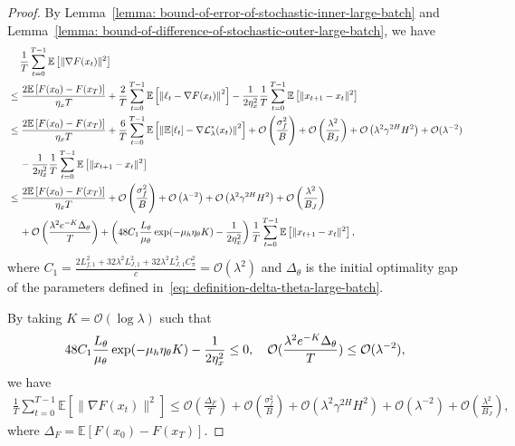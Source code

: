 \documentclass{article}
\theoremstyle{plain}
\theoremstyle{definition}
\theoremstyle{remark}
\def\E{\mathbb E}
\def\cL{\mathcal L}
\def\cO{\mathcal O}
\begin{document}
\begin{proof}
    By Lemma~\ref{lemma: bound-of-error-of-stochastic-inner-large-batch} and Lemma~\ref{lemma: bound-of-difference-of-stochastic-outer-large-batch}, we have
    \begin{align}
        & \quad \, \frac{1}{T}\sum_{t=0}^{T-1} \E \left[ \|\nabla F(x_t)  \|^2\right] \notag \\
        & \leq \frac{2\E \left[F(x_0) - F(x_T) \right]}{\eta_x T} + \frac{2}{T} \sum_{t=0}^{T-1}\E \left[ \left\| \ell_t - \nabla F(x_t)\right\|^2  \right]- \frac{1}{2\eta_x^2}\frac{1}{T}\sum_{t=0}^{T-1}  \E \left[ \| x_{t+1} - x_t \|^2\right] \\
        & \leq  \frac{2\E \left[F(x_0) - F(x_T) \right]}{\eta_x T} + \frac{6}{T} \sum_{t=0}^{T-1} \E \left[ \left\| \E [\ell_t] - \nabla \cL_\lambda^*(x_t)\right\|^2 \right] + \cO\left(\frac{\sigma_f^2}{B}\right) + \cO\left(\frac{\lambda^2}{B_{J}}\right) + \cO\left(\lambda^2\gamma^{2H}H^2\right)+ \cO(\lambda^{-2})\notag \\
        & \quad \,   - \frac{1}{2\eta_x^2} \frac{1}{T}\sum_{t=0}^{T-1} \E \left[ \| x_{t+1} - x_t \|^2\right] \\
        & \leq  \frac{2\E \left[F(x_0) - F(x_T) \right]}{\eta_x T} + \cO\left(\frac{\sigma_f^2}{B}\right)  + \cO\left(\lambda^{-2}\right) + \cO\left(\lambda^2 \gamma^{2H}H^2\right) + \cO\left(\frac{\lambda^2}{B_J}\right)    \notag \\
        & \quad \, + \cO\left(\frac{\lambda^2 e^{-K}\Delta_\theta}{T} \right)   + \left( 48 C_1 \frac{ L_{\theta}}{\mu_\theta} \exp( - \mu_h \eta_\theta K ) - \frac{1}{2 \eta_x^2} \right) \frac{1}{T}\sum_{t=0}^{T-1} \E \left[ \|x_{t+1} - x_{t} \|^2 \right],
    \end{align}
    where $C_1 = \frac{2L_{f,1}^2 + 32 \lambda^2L_{J,1}^2 + 32 \lambda^2 L_{J,1}^2 C_\pi^2}{c} = \cO(\lambda^2)$ and $\Delta_\theta $ is the initial optimality gap of the parameters defined in~\eqref{eq: definition-delta-theta-large-batch}.

    By taking $K = \cO\left(\log \lambda \right)$ such that 
    \begin{align}
        48 C_1 \frac{ L_{\theta}}{\mu_\theta} \exp( - \mu_h \eta_\theta K ) - \frac{1}{2 \eta_x^2} \leq 0 , \quad \cO(\frac{\lambda^2 e^{-K} \Delta_\theta}{T}) \leq \cO(\lambda^{-2}) , \notag 
    \end{align}
    we have
    \begin{align}
          \frac{1}{T}\sum_{t=0}^{T-1} \E \left[ \|\nabla F(x_t)  \|^2\right] \leq \cO\left(\frac{\Delta_F}{T}\right)  + \cO\left(\frac{\sigma_f^2}{B}\right) + \cO(\lambda^2\gamma^{2H}H^2) +  \cO\left(\lambda^{-2}\right) + \cO\left(\frac{\lambda^2}{B_J}\right) ,
    \end{align}
    where $\Delta_F = \E \left[ F(x_0) - F(x_T) \right]$. 


\end{proof}
\end{document}
